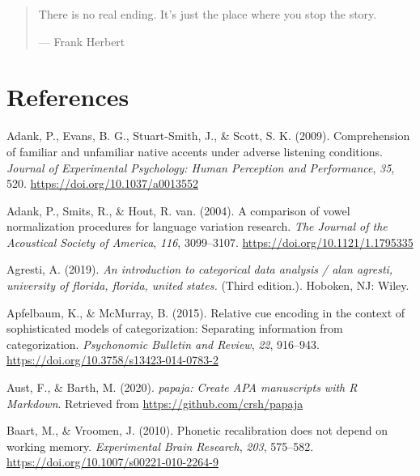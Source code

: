 \documentclass[
  11pt,
  man,floatsintext]{apa6}
\newlength{\cslhangindent}
\newlength{\cslentryspacingunit} %
\newenvironment{CSLReferences}[2] %
 {%
  \setlength{\parindent}{0pt}
  \ifodd #1
  \let\oldpar\par
  \def\par{\hangindent=\cslhangindent\oldpar}
  \fi
  \setlength{\parskip}{#2\cslentryspacingunit}
 }%
 {}
\begin{document}
\begin{quote}
There is no real ending. It's just the place where you stop the story.

\hfill --- Frank Herbert
\end{quote}

\newpage

\hypertarget{references}{%
\section{References}\label{references}}

\begingroup
\setlength{\parindent}{-0.5in}
\setlength{\leftskip}{0.5in}

\hypertarget{refs}{}
\begin{CSLReferences}{1}{0}
\leavevmode{}%
Adank, P., Evans, B. G., Stuart-Smith, J., \& Scott, S. K. (2009). Comprehension of familiar and unfamiliar native accents under adverse listening conditions. \emph{Journal of Experimental Psychology: Human Perception and Performance}, \emph{35}, 520. \url{https://doi.org/10.1037/a0013552}

\leavevmode{}%
Adank, P., Smits, R., \& Hout, R. van. (2004). A comparison of vowel normalization procedures for language variation research. \emph{The Journal of the Acoustical Society of America}, \emph{116}, 3099--3107. \url{https://doi.org/10.1121/1.1795335}

\leavevmode{}%
Agresti, A. (2019). \emph{An introduction to categorical data analysis / alan agresti, university of florida, florida, united states.} (Third edition.). Hoboken, NJ: Wiley.

\leavevmode{}%
Apfelbaum, K., \& McMurray, B. (2015). Relative cue encoding in the context of sophisticated models of categorization: Separating information from categorization. \emph{Psychonomic Bulletin and Review}, \emph{22}, 916--943. \url{https://doi.org/10.3758/s13423-014-0783-2}

\leavevmode{}%
Aust, F., \& Barth, M. (2020). \emph{{papaja}: {Create} {APA} manuscripts with {R Markdown}}. Retrieved from \url{https://github.com/crsh/papaja}

\leavevmode{}%
Baart, M., \& Vroomen, J. (2010). Phonetic recalibration does not depend on working memory. \emph{Experimental Brain Research}, \emph{203}, 575--582. \url{https://doi.org/10.1007/s00221-010-2264-9}


\end{CSLReferences}
\end{document}
